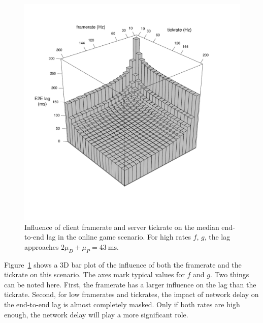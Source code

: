 \begin{figure}[!t]
	\centering
	\vspace{-6mm}
	\includegraphics[width=1.0\columnwidth]{../simulation/visualization/e2e-lag-3dbars.pdf}
	\vspace{-15mm}
	\caption{Influence of client framerate and server tickrate on the median end-to-end lag in the online game scenario. For high rates $f$, $g$, the lag approaches $2\mu_D+\mu_P=\SI{43}{\milli\second}$.}
\label{fig:3dbars-framerate-tickrate-lag}
\end{figure}

Figure~\ref{fig:3dbars-framerate-tickrate-lag} shows a 3D bar plot 
of the influence of both the framerate and the tickrate on this 
scenario. The axes mark typical values for $f$ and $g$. Two things 
can be noted here. First, the framerate has a larger influence on 
the lag than the tickrate. Second, for low framerates and tickrates, 
the impact of network delay on the end-to-end lag is almost 
completely masked. Only if both rates 
are high enough, the network delay will play a more significant role.

